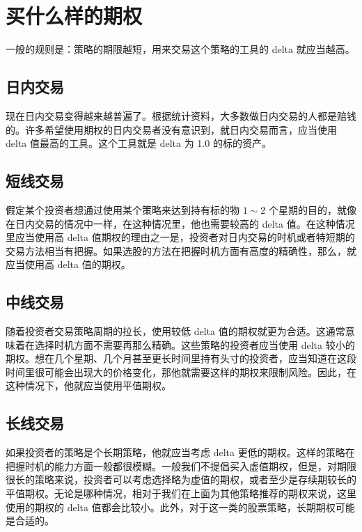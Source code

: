 \section{买什么样的期权}
一般的规则是：策略的期限越短，用来交易这个策略的工具的 delta 就应当越高。
\subsection{日内交易}
现在日内交易变得越来越普遍了。根据统计资料，大多数做日内交易的人都是赔钱的。许多希望使用期权的日内交易者没有意识到，就日内交易而言，应当使用 delta 值最高的工具。这个工具就是 delta 为 1.0 的标的资产。
\subsection{短线交易}
假定某个投资者想通过使用某个策略来达到持有标的物 $1 \sim 2$ 个星期的目的，就像在日内交易的情况中一样，在这种情况里，他也需要较高的 delta 值。在这种情况里应当使用高 delta 值期权的理由之一是，投资者对日内交易的时机或者特短期的交易方法相当有把握。如果选股的方法在把握时机方面有高度的精确性，那么，就应当使用高 delta 值的期权。
\subsection{中线交易}
随着投资者交易策略周期的拉长，使用较低 delta 值的期权就更为合适。这通常意味着在选择时机方面不需要再那么精确。这些策略的投资者应当使用 delta 较小的期权。想在几个星期、几个月甚至更长时间里持有头寸的投资者，应当知道在这段时间里很可能会出现大的价格变化，那他就需要这样的期权来限制风险。因此，在这种情况下，他就应当使用平值期权。
\subsection{长线交易}
如果投资者的策略是个长期策略，他就应当考虑 delta 更低的期权。这样的策略在把握时机的能力方面一般都很模糊。一般我们不提倡买入虚值期权，但是，对期限很长的策略来说，投资者可以考虑选择略为虚值的期权，或者至少是存续期较长的平值期权。无论是哪种情况，相对于我们在上面为其他策略推荐的期权来说，这里使用的期权的 delta 值都会比较小。此外，对于这一类的股票策略，长期期权可能是合适的。
